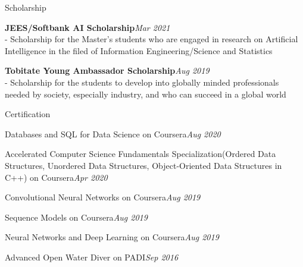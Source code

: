 \documentclass{resume} %
\begin{document}
\begin{rSection}{Scholarship}
 \item {\bf JEES/Softbank AI Scholarship}\hfill {\em Mar 2021}\\- Scholarship for the Master's students who are engaged in research on Artificial Intelligence in the filed of Information Engineering/Science and Statistics

 \item {\bf Tobitate Young Ambassador Scholarship}\hfill {\em Aug 2019}\\- Scholarship for the students to develop into globally minded professionals needed by society, especially industry, and who can succeed in a global world

\end{rSection}

\newpage

\begin{rSection}{Certification}
 \item Databases and SQL for Data Science on Coursera\hfill {\em Aug 2020}
\item Accelerated Computer Science Fundamentals Specialization(Ordered Data Structures, Unordered Data Structures, Object-Oriented Data Structures in C++) on Coursera\hfill {\em Apr 2020}
\item Convolutional Neural Networks on Coursera\hfill {\em Aug 2019}
\item Sequence Models on Coursera\hfill {\em Aug 2019}
\item Neural Networks and Deep Learning on Coursera\hfill{\em Aug 2019}
\item Advanced Open Water Diver on PADI\hfill{\em Sep 2016}
\end{rSection}
\end{document}

